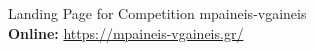 \begin{figure}[H]
	\caption{
		Landing Page for Competition mpaineis-vgaineis
		\\
		\textbf{Online: } \url{https://mpaineis-vgaineis.gr/}
	}
	\label{fig:example}
\end{figure}

